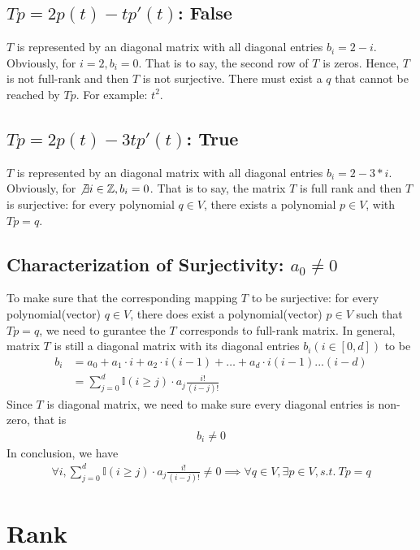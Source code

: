 \documentclass[11pt,a4paper]{report}
\begin{document}
\subsection{$Tp=2p(t)-tp'(t)$: False}
$T$ is represented by an diagonal matrix with all diagonal entries 
$b_i = 2 - i$. Obviously, for $i = 2, b_i = 0$. That is to say, the second row
of $T$ is zeros. Hence, $T$ is not full-rank and then $T$ is not surjective.
There must exist a $q$ that cannot be reached by $Tp$. For example: $t^2$.
\subsection{$Tp=2p(t)-3tp'(t)$: True}
$T$ is represented by an diagonal matrix with all diagonal entries 
$b_i = 2 - 3*i$. Obviously, for $\not \exists i \in \mathbb{Z}, b_i = 0$.
That is to say, the matrix $T$ is full rank and then $T$ is surjective: for
every polynomial $q \in V$, there exists a polynomial $p \in V$, with $Tp = q$.
\subsection{Characterization of Surjectivity: $a_0 \not = 0$}
To make sure that the corresponding mapping $T$ to be surjective: for every
polynomial(vector) $q \in V$, there does exist a polynomial(vector) $p \in V$
such that $Tp = q$, we need to gurantee the $T$ corresponds to full-rank
matrix. In general, matrix $T$ is still a diagonal matrix with its diagonal
entries $b_i (i \in [0, d])$ to be 
\begin{align}
    b_i &= a_0 + a_1 \cdot i + a_2 \cdot i (i-1) + \dots + a_d \cdot i
    (i-1)...(i-d) \\
    &= \sum_{j=0}^d \mathbb{I} (i \geq j) \cdot a_{j} \frac{i!}{(i-j)!}
\end{align}
Since $T$ is diagonal matrix, we need to make sure every diagonal entries is
non-zero, that is 
\begin{align}
    b_i \not = 0
\end{align}
In conclusion, we have \begin{align}
    \forall i, \sum_{j=0}^d \mathbb{I} (i \geq j) \cdot a_{j} \frac{i!}{(i-j)!} \not = 0 
    \implies \forall q \in V, \exists p \in V, s.t.\ Tp=q
\end{align}

\newpage
\newcommand{\rank}[1]{rank(#1)}
\section{Rank}
\end{document}
